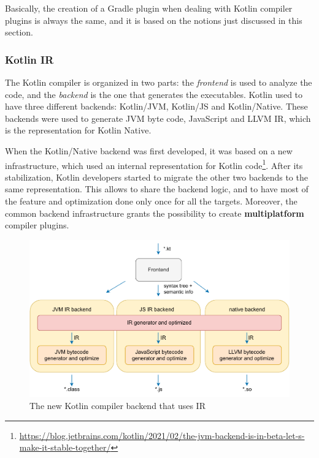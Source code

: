 Basically, the creation of a Gradle plugin when dealing with Kotlin compiler plugins is always the same, and it is based on the notions just discussed in this section.

\subsubsection{Kotlin IR}\label{section:kotlin_ir}
The Kotlin compiler is organized in two parts: the \textit{frontend} is used to analyze the code, and the \textit{backend} is the one that generates the executables.\newline
Kotlin used to have three different backends: Kotlin/JVM, Kotlin/JS and Kotlin/Native. These backends were used to generate JVM byte code, JavaScript and LLVM IR, which is the representation for Kotlin Native.

When the Kotlin/Native backend was first developed, it was based on a new infrastructure, which used an internal representation for Kotlin code\footnote{\url{https://blog.jetbrains.com/kotlin/2021/02/the-jvm-backend-is-in-beta-let-s-make-it-stable-together/}}. After its stabilization, Kotlin developers started to migrate the other two backends to the same representation. This allows to share the backend logic, and to have most of the feature and optimization done only once for all the targets. Moreover, the common backend infrastructure grants the possibility to create \textbf{multiplatform} compiler plugins.

\begin{figure}[!ht]
    \centering
    \includegraphics[scale=0.9]{document/chapters/2-metaprogramming/images/kotlin_compiler_plugin_ir_representation.pdf}
    \caption{The new Kotlin compiler backend that uses IR}
    \label{fig:kotlin_compiler_plugin_ir_representation}
\end{figure}

